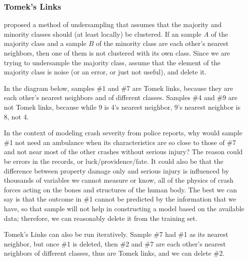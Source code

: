 \subsubsection{Tomek's Links}

\cite{ivan1976two} proposed a method of undersampling that assumes that the majority and minority classes should (at least locally) be clustered.  If an sample $A$ of the majority class and a sample $B$ of the minority class are each other's nearest neighbors, then one of them is not clustered with its own class.  Since we are trying to undersample the majority class, assume that the element of the majority class is noise (or an error, or just not useful), and delete it.  

In the diagram below, samples \#1 and \#7 are Tomek links, because they are each other's nearest neighbors and of different classes.  Samples \#4 and \#9 are not Tomek links, because while 9 is 4's nearest neighbor, 9's nearest neighbor is 8, not 4.  

In the context of modeling crash severity from police reports, why would sample \#1 not need an ambulance when its characteristics are so close to those of \#7 and not near most of the other crashes without serious injury?  The reason could be errors in the records, or luck/providence/fate.  It could also be that the difference between property damage only and serious injury is influenced by thousands of variables we cannot measure or know, all of the physics of crash forces acting on the bones and structures of the human body.  The best we can say is that the outcome in \#1 cannot be predicted by the information that we have, so that sample will not help in constructing a model based on the available data; therefore, we can reasonably delete it from the training set.  

Tomek's Links can also be run iteratively.  Sample \#7 had \#1 as its nearest neighbor, but once \#1 is deleted, then \#2 and \#7 are each other's nearest neighbors of different classes, thus are Tomek links, and we can delete \#2.  



\begin{center}
\end{center}



